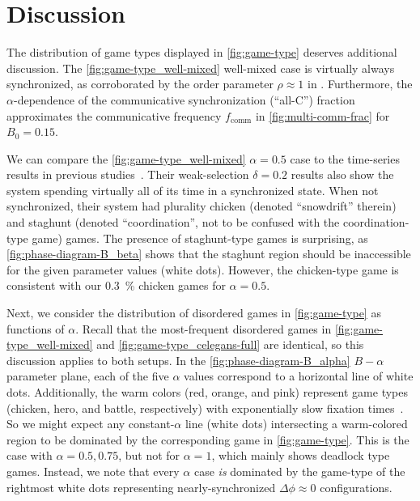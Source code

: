 \documentclass[pdflatex,lineno,referee,sn-nature]{sn-jnl}
\begin{document}
\section{Discussion}\label{sec:discussion}

The distribution of game types displayed in \cref{fig:game-type}
deserves additional discussion.
The \cref{fig:game-type_well-mixed} well-mixed case
is virtually always synchronized,
as corroborated by the order parameter $\rho \approx 1$ in
.
Furthermore,
the $\alpha$-dependence of the
communicative synchronization (``all-C'') fraction
approximates the communicative frequency $f_{\text{comm}}$
in \cref{fig:multi-comm-frac} for $B_0=0.15$.

We can compare the \cref{fig:game-type_well-mixed}
$\alpha = 0.5$ case
to the time-series results
in previous studies~\citep{tripp2022evolutionary}.
Their weak-selection $\delta = 0.2$
results also show the system spending
virtually all of its time in a synchronized state.
When not synchronized, their system had plurality
chicken (denoted ``snowdrift'' therein)
and staghunt (denoted ``coordination'',
not to be confused with the coordination-type game) games.
The presence of staghunt-type games is surprising,
as \cref{fig:phase-diagram-B_beta}
shows that the staghunt region should be inaccessible
for the given parameter values (white dots).
However, the chicken-type game is consistent with our
\SI{0.3}{\percent} chicken games for $\alpha = 0.5$.

Next, we consider the distribution of disordered games
in \cref{fig:game-type} as functions of $\alpha$.
Recall that the most-frequent disordered games
in \cref{fig:game-type_well-mixed}
and \cref{fig:game-type_celegans-full} are identical,
so this discussion applies to both setups.
In the \cref{fig:phase-diagram-B_alpha}
$B-\alpha$ parameter plane,
each of the five $\alpha$ values
correspond to a horizontal line of white dots.
Additionally, the warm colors (red, orange, and pink)
represent game types (chicken, hero, and battle, respectively)
with exponentially slow fixation times~\citep{antal2006fixation}.
So we might expect any constant-$\alpha$ line (white dots) intersecting
a warm-colored region
to be dominated by the corresponding game in \cref{fig:game-type}.
This is the case with $\alpha = 0.5, 0.75$,
but not for $\alpha = 1$,
which mainly shows deadlock type games.
Instead, we note that every $\alpha$ case \emph{is} dominated
by the game-type of the rightmost white dots
representing nearly-synchronized $\Delta \phi \approx 0$ configurations.
\end{document}
